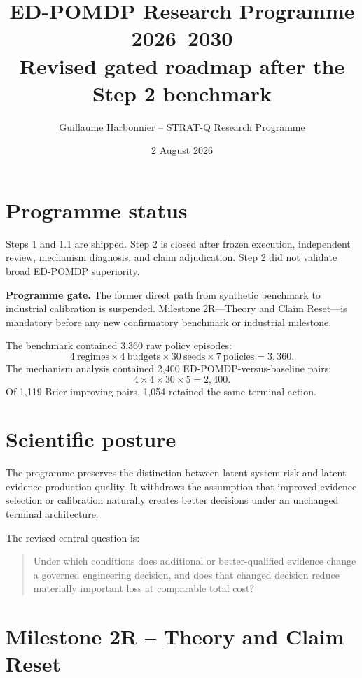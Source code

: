 \documentclass[11pt,a4paper]{report}
\title{\textbf{ED-POMDP Research Programme 2026--2030}\\
\large Revised gated roadmap after the Step 2 benchmark}
\author{Guillaume Harbonnier -- STRAT-Q Research Programme}
\date{2 August 2026}
\begin{document}
\maketitle
\tableofcontents

\chapter{Programme status}

Steps 1 and 1.1 are shipped. Step 2 is closed after frozen execution, independent review, mechanism diagnosis, and claim adjudication. Step 2 did not validate broad ED-POMDP superiority.

\begin{tcolorbox}[colback=softblue,colframe=deepblue,boxrule=0.8pt,arc=2mm]
\textbf{Programme gate.} The former direct path from synthetic benchmark to industrial calibration is suspended. Milestone 2R---Theory and Claim Reset---is mandatory before any new confirmatory benchmark or industrial milestone.
\end{tcolorbox}

The benchmark contained 3,360 raw policy episodes:
\[
4\ \mathrm{regimes}\times 4\ \mathrm{budgets}\times 30\ \mathrm{seeds}\times 7\ \mathrm{policies}=3{,}360.
\]
The mechanism analysis contained 2,400 ED-POMDP-versus-baseline pairs:
\[
4\times4\times30\times5=2{,}400.
\]
Of 1,119 Brier-improving pairs, 1,054 retained the same terminal action.

\chapter{Scientific posture}

The programme preserves the distinction between latent system risk and latent evidence-production quality. It withdraws the assumption that improved evidence selection or calibration naturally creates better decisions under an unchanged terminal architecture.

The revised central question is:
\begin{quote}
Under which conditions does additional or better-qualified evidence change a governed engineering decision, and does that changed decision reduce materially important loss at comparable total cost?
\end{quote}

\chapter{Milestone 2R -- Theory and Claim Reset}
\end{document}
